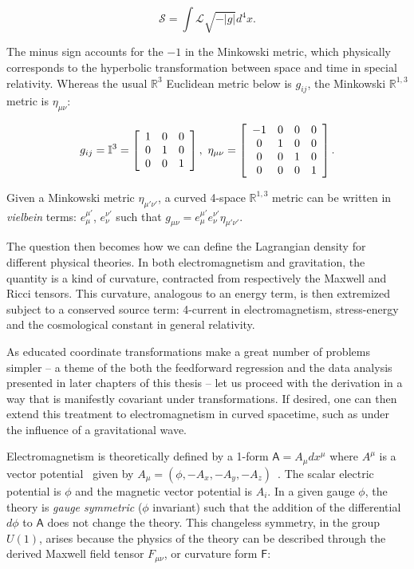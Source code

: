 \begin{equation}
\mathcal{S} = \int \mathcal{L} \sqrt{-|g|} d^4 x.
\end{equation} 

The minus sign accounts for the $-1$ in the Minkowski metric, which physically corresponds to the hyperbolic transformation between space and time in special relativity.
Whereas the usual $\mathbb{R}^3$ Euclidean metric below is $g_{ij}$, the Minkowski $\mathbb{R}^{1,3}$ metric is $\eta_{\mu\nu}$:

\begin{eqnarray}
g_{ij} = \mathbb{I}^3 = 
\left[
\begin{array}{ccc}
1 & 0 & 0 \\
0 & 1 & 0 \\
0 & 0 & 1
\end{array} \right],
\textup{ }
\eta_{\mu\nu} =
\left[
\begin{array}{cccc}
-1 & 0 & 0 & 0\\
0 & 1 & 0 & 0 \\
0 & 0 & 1 & 0\\
0 & 0 & 0 & 1
\end{array} \right].
\end{eqnarray}

Given a Minkowski metric $\eta_{\mu' \nu'}$, a curved 4-space $\mathbb{R}^{1,3}$ metric can be written in \textit{vielbein} terms: $e^{\mu'}_{\mu}$, $e^{\nu'}_{\nu}$ such that $g_{\mu\nu} = e^{\mu'}_{\mu} e^{\nu'}_{\nu} \eta_{\mu' \nu'}$.


The question then becomes how we can define the Lagrangian density for different physical theories. 
In both electromagnetism and gravitation, the quantity is a kind of curvature, contracted from respectively the Maxwell and Ricci tensors. 
This curvature, analogous to an energy term, is then extremized subject to a conserved source term: 4-current in electromagnetism, stress-energy and the cosmological constant in general relativity.

As educated coordinate transformations make a great number of problems simpler -- a theme of the both the feedforward regression and the data analysis presented in later chapters of this thesis -- let us proceed with the derivation in a way that is manifestly covariant under transformations. If desired, one can then extend this treatment to electromagnetism in curved spacetime, such as under the influence of a gravitational wave. 

    Electromagnetism is theoretically defined by a 1-form $\textsf{A} = A_\mu d x^\mu$ where $A^\mu$ is a vector potential~\cite{MisnerThorneWheeler} given by $A_\mu = (\phi, -A_x, -A_y, -A_z)$~\cite{GriffithsE}. 
The scalar electric potential is $\phi$ and the magnetic vector potential is $A_i$.
In a given gauge $\phi$, the theory is \textit{gauge symmetric} ($\phi$ invariant) such that the addition of the differential $d \phi$ to $\textsf{A}$ does not change the theory. 
This changeless symmetry, in the group $U(1)$, arises because the physics of the theory can be described through the derived Maxwell field tensor $F_{\mu \nu}$, or curvature form $\textsf{F}$:

